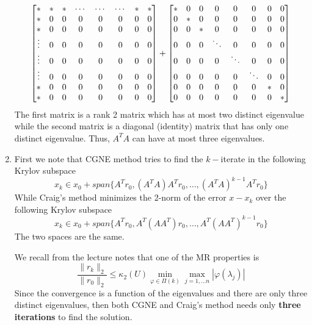 \begin{enumerate}
$$
\setcounter{MaxMatrixCols}{11}
\begin{bmatrix}
* & * & * & \cdots & \cdots & \cdots & * & *\\
* & 0 & 0 & 0 & 0 & 0 & 0 & 0\\
* & 0 & 0 & 0 & 0 & 0 & 0 & 0\\
\vdots & 0 & 0 & 0 & 0 & 0 & 0 & 0\\
\vdots & 0 & 0 & 0 & 0 & 0 & 0 & 0\\
\vdots & 0 & 0 & 0 & 0 & 0 & 0 & 0\\
* & 0 & 0 & 0 & 0 & 0 & 0 & 0\\
* & 0 & 0 & 0 & 0 & 0 & 0 & 0\\
\end{bmatrix} + 
\setcounter{MaxMatrixCols}{11}
\begin{bmatrix}
* & 0 & 0 & 0 & 0 & 0 & 0 & 0\\
0 & * & 0 & 0 & 0 & 0 & 0 & 0\\
0 & 0 & * & 0 & 0 & 0 & 0 & 0\\
0 & 0 & 0 & \ddots & 0 & 0 & 0 & 0\\
0 & 0 & 0 & 0 & \ddots & 0 & 0 & 0\\
0 & 0 & 0 & 0 & 0 & \ddots & 0 & 0\\
0 & 0 & 0 & 0 & 0 & 0 & * & 0\\
0 & 0 & 0 & 0 & 0 & 0 & 0 & *\\
\end{bmatrix}
$$
The first matrix is a rank 2 matrix which has at most two distinct eigenvalue while the second matrix is a diagonal (identity) matrix that has only one distinct eigenvalue. Thus, $A^{T}A$ can have at most three eigenvalues. 

\item First we note that CGNE method tries to find the $k-$iterate in the following Krylov subspace 
$$
x_{k} \in x_{0} + span\{ A^{T}r_{0}, (A^{T}A)A^{T}r_{0}, \dots, (A^{T}A)^{k-1}A^{T}r_{0} \}
$$
While Craig's method minimizes the 2-norm of the error $x-x_{k}$ over the following Krylov subspace
$$
x_{k} \in x_{0} + span\{ A^{T}r_{0}, A^{T}(AA^{T})r_{0}, \dots, A^{T}(AA^{T})^{k-1}r_{0} \}
$$
The two spaces are the same. 

We recall from the lecture notes that one of the MR properties is 
$$
\frac{\parallel r_{k} \parallel_{2}}{\parallel r_{0} \parallel_{2}} \leq \kappa_{2}(U) \min_{\varphi \in\Pi(k)} \max_{j=1,\dots	n}|\varphi(\lambda_{j})|
$$
Since the convergence is a function of the eigenvalues and there are only three distinct eigenvalues, then both CGNE and Craig's method needs only \textbf{three iterations} to find the solution. 
\end{enumerate}